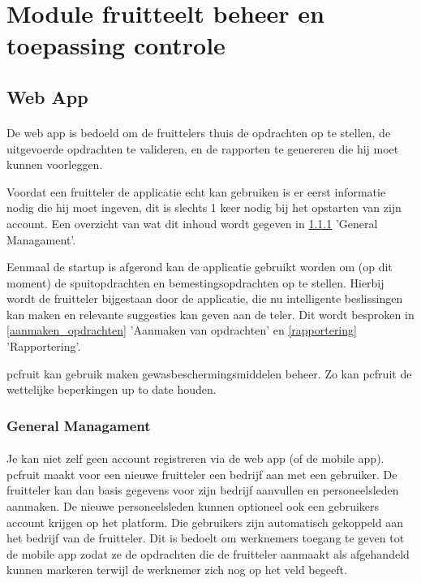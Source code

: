 \section {Module fruitteelt beheer en toepassing controle}

\subsection {Web App}

\paragraph {} De web app is bedoeld om de fruittelers thuis de opdrachten op te stellen,
de uitgevoerde opdrachten te valideren, en de rapporten te genereren die hij moet kunnen
voorleggen.

Voordat een fruitteler de applicatie echt kan gebruiken is er eerst informatie nodig die
hij moet ingeven, dit is slechts 1 keer nodig bij het opstarten van zijn account. Een
overzicht van wat dit inhoud wordt gegeven in \ref{general_management} 'General
Managament'.

Eenmaal de startup is afgerond kan de applicatie gebruikt worden om (op dit moment) de
spuitopdrachten en bemestingsopdrachten op te stellen. Hierbij wordt de fruitteler
bijgestaan door de applicatie, die nu intelligente beslissingen kan maken en relevante
suggesties kan geven aan de teler. Dit wordt besproken in \ref{aanmaken_opdrachten}
'Aanmaken van opdrachten' en \ref{rapportering} 'Rapportering'.

pcfruit kan gebruik maken gewasbeschermingsmiddelen beheer. Zo kan pcfruit de wettelijke
beperkingen up to date houden.


\subsubsection {General Managament}\label{general_management}

\paragraph {} Je kan niet zelf geen account registreren via de web app (of de mobile app).
pcfruit maakt voor een nieuwe
fruitteler een bedrijf aan met een gebruiker. De fruitteler kan dan basis gegevens voor
zijn bedrijf aanvullen en personeelsleden aanmaken. De nieuwe personeelsleden kunnen
optioneel ook een gebruikers account krijgen op het platform. Die gebruikers zijn
automatisch gekoppeld aan het bedrijf van de fruitteler. Dit is bedoelt om werknemers
toegang te geven tot de mobile app zodat ze de opdrachten die de fruitteler aanmaakt als
afgehandeld kunnen markeren terwijl de werknemer zich nog op het veld begeeft.

